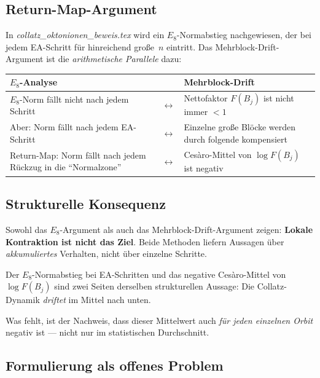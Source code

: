 \documentclass[12pt,a4paper]{article}
\begin{document}
\subsection{Return-Map-Argument}

In \textit{collatz\_oktonionen\_beweis.tex} wird ein $E_8$-Normabstieg
nachgewiesen, der bei jedem EA-Schritt für hinreichend große~$n$ eintritt.
Das Mehrblock-Drift-Argument ist die \emph{arithmetische Parallele} dazu:

\begin{center}
\renewcommand{\arraystretch}{1.4}
\begin{tabular}{p{4.5cm}p{1.5cm}p{5.5cm}}
\toprule
\textbf{$E_8$-Analyse} & & \textbf{Mehrblock-Drift} \\
\midrule
$E_8$-Norm fällt nicht nach jedem Schritt &$\longleftrightarrow$&
  Nettofaktor $F(B_j)$ ist nicht immer $<1$ \\[4pt]
Aber: Norm fällt nach jedem EA-Schritt &$\longleftrightarrow$&
  Einzelne große Blöcke werden durch folgende kompensiert \\[4pt]
Return-Map: Norm fällt nach jedem Rückzug in die ``Normalzone'' &$\longleftrightarrow$&
  Cesàro-Mittel von $\log F(B_j)$ ist negativ \\
\bottomrule
\end{tabular}
\end{center}

\subsection{Strukturelle Konsequenz}

\begin{tcolorbox}[kernidee, title={Gemeinsamer Kern}]
Sowohl das $E_8$-Argument als auch das Mehrblock-Drift-Argument zeigen:
\textbf{Lokale Kontraktion ist nicht das Ziel}. Beide Methoden liefern
Aussagen über \emph{akkumuliertes} Verhalten, nicht über einzelne Schritte.

Der $E_8$-Normabstieg bei EA-Schritten und das negative Cesàro-Mittel
von $\log F(B_j)$ sind zwei Seiten derselben strukturellen Aussage:
Die Collatz-Dynamik \emph{driftet} im Mittel nach unten.

Was fehlt, ist der Nachweis, dass dieser Mittelwert auch
\emph{für jeden einzelnen Orbit} negativ ist --- nicht nur im
statistischen Durchschnitt.
\end{tcolorbox}

\subsection{Formulierung als offenes Problem}
\end{document}
